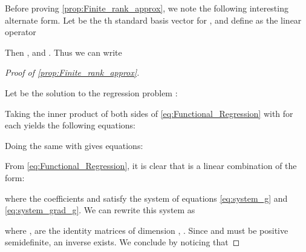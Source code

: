\documentclass{article}
\begin{document}
Before proving \cref{prop:Finite_rank_approx},
we note the following interesting alternate form.
Let  be the th standard basis vector for ,
and define  as the linear operator

Then ,
and .
Thus we can write




\begin{proof}[Proof of \cref{prop:Finite_rank_approx}]
\label{proof:Finite_rank_approx}

Let  be the solution to the regression problem :

Taking the inner product of both sides of \eqref{eq:Functional_Regression}
with  for each 
yields the following  equations:

Doing the same with  gives  equations:

From \eqref{eq:Functional_Regression}, it is clear that  is a linear
combination of the form:

where the coefficients 
and  satisfy the system of equations \eqref{eq:system_g} and \eqref{eq:system_grad_g}.
We can rewrite this system as

where ,  are the identity matrices of dimension , .
Since  and  must be positive semidefinite, an inverse exists.
We conclude by noticing that

\end{proof}
\end{document}
